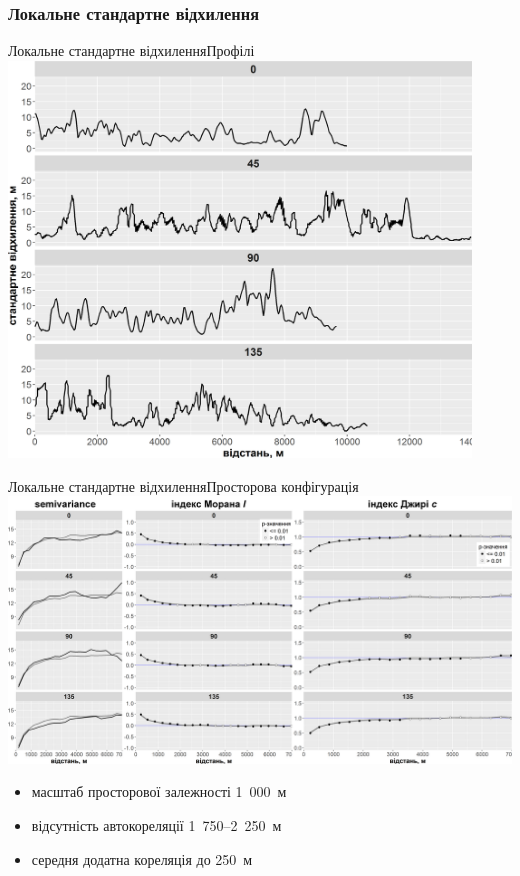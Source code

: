 \documentclass[]{beamer}
\begin{document}
\subsubsection{Локальне стандартне відхилення}
\begin{frame}{Локальне стандартне відхилення}{Профілі}
\includegraphics[width=0.92\textwidth]{./pres_figures/plots_std_dev/profiles_plot.png}%
\end{frame}

\begin{frame}{Локальне стандартне відхилення}{Просторова конфігурація}
\includegraphics[width=\textwidth]{./pres_figures/plots_std_dev/std_dev_all.png}%

\begin{itemize}
\item масштаб просторової залежності 1~000~м
\item відсутність автокореляції 1~750--2~250~м
\item середня додатна кореляція до 250~м
\end{itemize}
\end{frame}
\end{document}
